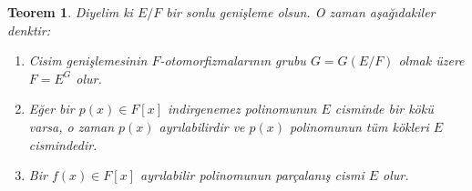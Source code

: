 \documentclass{article}
\newtheorem{thm}{Teorem}[section]
\theoremstyle{definition}
\theoremstyle{remark}
\begin{document}
    		\begin{thm}\label{5.6}
    		    Diyelim ki $E/F$ bir sonlu genişleme olsun. O zaman aşağıdakiler denktir:
    		    \begin{enumerate}
    				\renewcommand{\labelenumi}{(\roman{enumi})}
    				\item Cisim genişlemesinin $F$-otomorfizmalarının grubu $G = G(E/F)$ olmak üzere $F = E^G$ olur.
    				\item Eğer bir $p(x) \in F[x]$ indirgenemez polinomunun $E$ cisminde bir kökü varsa, o zaman $p(x)$ ayrılabilirdir ve $p(x)$ polinomunun tüm kökleri $E$ cismindedir.
    				\item Bir $f(x) \in F[x]$ ayrılabilir polinomunun parçalanış cismi $E$ olur.
    			\end{enumerate}
    		\end{thm}
    		
\end{document}
